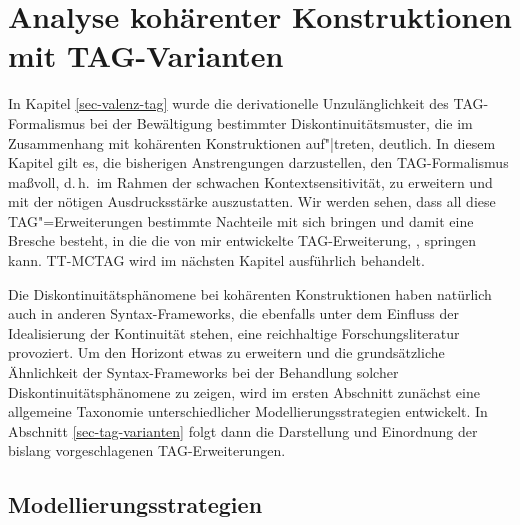 
\chapter{Analyse kohärenter Konstruktionen mit TAG-Varianten} \label{sec-kohaerenz-tag}

In Kapitel \ref{sec-valenz-tag} wurde die derivationelle Unzulänglichkeit des TAG-Formalismus bei der Bewältigung bestimmter Diskontinuitätsmuster, die im Zusammenhang mit kohärenten Konstruktionen auf"|treten, deutlich. In diesem Kapitel gilt es, die bisherigen Anstrengungen darzustellen, den TAG-Formalismus ma\ss voll, d.\,h.\ im Rahmen der schwachen Kontextsensitivität, zu erweitern und mit der nötigen Ausdrucksstärke auszustatten. Wir werden sehen, dass all diese TAG"=Erweiterungen bestimmte Nachteile mit sich bringen und damit eine Bresche besteht, in die die von mir entwickelte TAG-Erweiterung, , springen kann. TT-MCTAG wird im nächsten Kapitel ausführlich behandelt. 

Die Diskontinuitätsphänomene bei kohärenten Konstruktionen haben natürlich auch in anderen Syntax-Frameworks, die ebenfalls unter dem Einfluss der Idealisierung der Kontinuität stehen, eine reichhaltige Forschungsliteratur provoziert. Um den Horizont etwas zu erweitern und die grundsätzliche Ähnlichkeit der Syntax-Frameworks bei der Behandlung solcher Diskontinuitätsphänomene zu zeigen, wird im ersten Abschnitt zunächst eine allgemeine Taxonomie unterschiedlicher Modellierungsstrategien entwickelt. In Abschnitt \ref{sec-tag-varianten} folgt dann die Darstellung und Einordnung der bislang vorgeschlagenen TAG-Erweiterungen.  

\section{Modellierungsstrategien} \label{sec-ttmctag-modellierungsstrategien}

